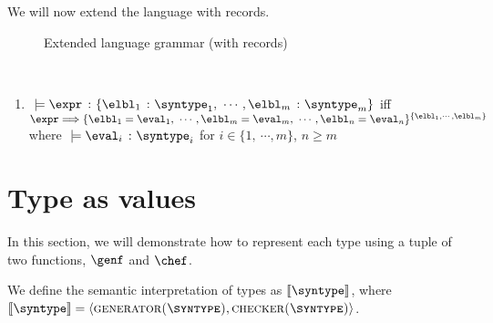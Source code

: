 We will now extend the language with records.

\begin{figure}[hbt!]%
  \begin{grammar}
            \grule[expressions]{\expr}{
              \cdots
              \gor \{\overline{\elbl = \expr}\}^{\{\overline{\elbl}\}}
            }
            \grule[values]{\eval}{
              \cdots
              \gor \{\overline{\elbl = \eval}\}^{\{\overline{\elbl}\}}
            }
            \grule[types]{\syntype}{
              \cdots
              \gor \{\overline{\hastype{\elbl}{\syntype}}\} 
          }
        \end{grammar}
    \caption{Extended language grammar (with records)}
    \label{rec_Grammar}
\end{figure}

\begin{definition}
  \label{def_typingRec}
  \ \par
  \begin{enumerate}
      \item $\ \models \hastype{\expr}{\{\hastype{\elbl_1}{\syntype_1},\ \cdots, \hastype{\elbl_m}{\syntype_m}\}}$ iff $\expr \bigstep \{\elbl_1 = \eval_1,\ \cdots, \elbl_m = \eval_m,\ \cdots, \elbl_n = \eval_n\}^{\{\elbl_1, \cdots, \elbl_m\}}$ where $\ \models \hastype{\eval_i}{\syntype_i}$ for $i \in \{1,\ \cdots, m\}$, $n \geq m$
  \end{enumerate}
\end{definition}

\section{Type as values}

In this section, we will demonstrate how to represent each type using a tuple of two functions, $\genf$ and $\chef$.

\begin{definition}
  \label{def_typeAsVal}
  We define the semantic interpretation of types as $\llbracket \syntype \rrbracket$, where $\llbracket \syntype \rrbracket = \langle \mkgen{\syntype}, \mkche{\syntype} \rangle$.
\end{definition}

